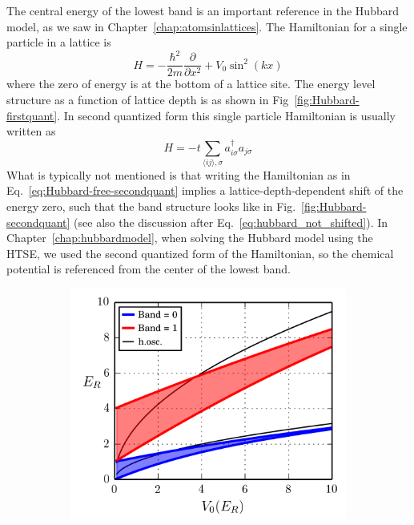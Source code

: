 \begin{itemize}
The central energy of the lowest band is an important reference in the Hubbard
model, as we saw in Chapter~\ref{chap:atomsinlattices}.    The Hamiltonian for a single particle in a lattice is  
\begin{equation} 
  H  = -\frac{\hbar^{2}}{2m} \frac{ \partial }{ \partial x^{2} } +  
       V_{0} \sin^{2}(kx)  
\end{equation}  
where the zero of energy is at the bottom of a lattice site.  The energy level
structure as a function of lattice depth is as shown in
Fig~\ref{fig:Hubbard-firstquant}.   In second quantized form this single
particle Hamiltonian is usually written as  
\begin{equation} 
  H  = -t \sum_{ \langle ij \rangle, \sigma } a_{i\sigma}^{\dagger} a_{j\sigma} 
  \label{eq:Hubbard-free-secondquant}
\end{equation}  
What is typically not mentioned is that writing the Hamiltonian as in
Eq.~\ref{eq:Hubbard-free-secondquant} implies a lattice-depth-dependent  shift
of the energy zero, such that the band structure looks like in
Fig.~\ref{fig:Hubbard-secondquant} (see also the discussion after
Eq.~\ref{eq:hubbard_not_shifted}).  In Chapter~\ref{chap:hubbardmodel}, when
solving the Hubbard model using the HTSE, we used the second quantized form of
the Hamiltonian, so the chemical potential is referenced from the center of the
lowest band.    
\begin{figure}
        \centering
        \begin{subfigure}[t]{0.4\textwidth}
		\includegraphics[width=\textwidth]{../figures/lda_evap/bands1d_V0_firstquant.png}

\end{subfigure}
\end{figure}
\end{itemize}
